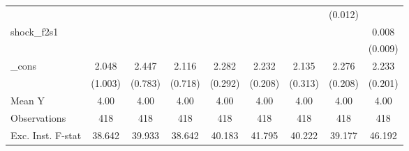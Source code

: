 {\begin{tabular}{l*{8}{c}}
            &                     &                     &                     &                     &                     &                     &     (0.012)         &                     \\
\addlinespace
shock\_f2s1  &                     &                     &                     &                     &                     &                     &                     &       0.008         \\
            &                     &                     &                     &                     &                     &                     &                     &     (0.009)         \\
\addlinespace
\_cons      &       2.048\sym{*}  &       2.447\sym{***}&       2.116\sym{***}&       2.282\sym{***}&       2.232\sym{***}&       2.135\sym{***}&       2.276\sym{***}&       2.233\sym{***}\\
            &     (1.003)         &     (0.783)         &     (0.718)         &     (0.292)         &     (0.208)         &     (0.313)         &     (0.208)         &     (0.201)         \\
\midrule
Mean Y      &        4.00         &        4.00         &        4.00         &        4.00         &        4.00         &        4.00         &        4.00         &        4.00         \\
Observations&         418         &         418         &         418         &         418         &         418         &         418         &         418         &         418         \\
Exc. Inst. F-stat&      38.642         &      39.933         &      38.642         &      40.183         &      41.795         &      40.222         &      39.177         &      46.192         \\
\bottomrule
\end{tabular}
}
